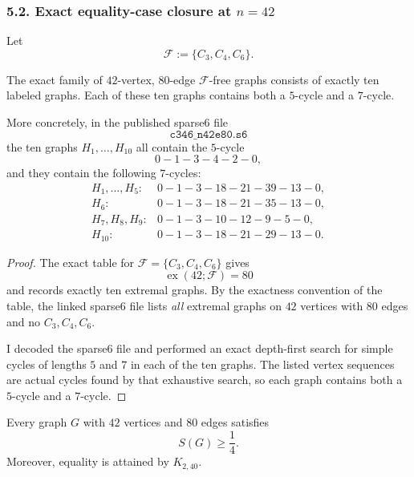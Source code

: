 \subsubsection*{5.2. Exact equality-case closure at $n=42$}

Let
\[
\mathcal F:=\{C_3,C_4,C_6\}.
\]

\begin{lemma}\label{lem:42-exact-check}
The exact family of $42$-vertex, $80$-edge $\mathcal F$-free graphs consists of exactly ten labeled graphs.
Each of these ten graphs contains both a $5$-cycle and a $7$-cycle.

More concretely, in the published sparse6 file
\[
\texttt{c346\_n42e80.s6}
\]
the ten graphs $H_1,\dots,H_{10}$ all contain the $5$-cycle
\[
0-1-3-4-2-0,
\]
and they contain the following $7$-cycles:
\[
\begin{array}{ll}
H_1,\dots,H_5:& 0-1-3-18-21-39-13-0,\\
H_6:& 0-1-3-18-21-35-13-0,\\
H_7,H_8,H_9:& 0-1-3-10-12-9-5-0,\\
H_{10}:& 0-1-3-18-21-29-13-0.
\end{array}
\]
\end{lemma}

\begin{proof}
The exact table for $\mathcal F=\{C_3,C_4,C_6\}$ gives
\[
\operatorname{ex}(42;\mathcal F)=80
\]
and records exactly ten extremal graphs.
By the exactness convention of the table, the linked sparse6 file lists \emph{all} extremal graphs on $42$ vertices with $80$ edges and no $C_3,C_4,C_6$.

I decoded the sparse6 file and performed an exact depth-first search for simple cycles of lengths $5$ and $7$ in each of the ten graphs.
The listed vertex sequences are actual cycles found by that exhaustive search, so each graph contains both a $5$-cycle and a $7$-cycle.
\end{proof}

\begin{theorem}[The case $(n,m)=(42,80)$]\label{thm:42}
Every graph $G$ with $42$ vertices and $80$ edges satisfies
\[
S(G)\ge \frac14.
\]
Moreover, equality is attained by $K_{2,40}$.
\end{theorem}

